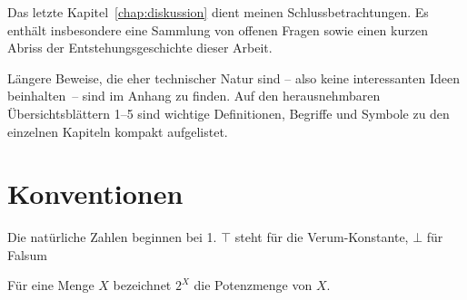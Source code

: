 Das
letzte Kapitel~\ref{chap:diskussion} dient meinen Schlussbetrachtungen.
Es enthält insbesondere eine Sammlung von offenen Fragen %
sowie einen kurzen Abriss der Entstehungsgeschichte dieser Arbeit.

Längere
Beweise, die eher technischer Natur sind -- also keine interessanten Ideen beinhalten~-- sind im Anhang zu finden.
Auf den herausnehmbaren Übersichtsblättern 1--5 sind wichtige Definitionen, Begriffe und Symbole zu den einzelnen Kapiteln kompakt aufgelistet.

\section{Konventionen}
Die natürliche Zahlen beginnen bei 1.
$\top$ steht für die Verum-Konstante, $\bot$ für Falsum

Für eine Menge $X$ bezeichnet $2^X$ die Potenzmenge von $X$.


